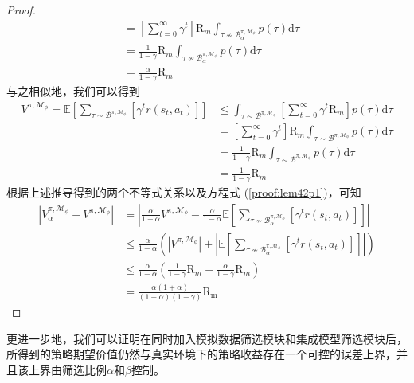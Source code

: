 \begin{proof}
\begin{align}
&=\left[\sum_{t=0}^\infty\gamma^t\right]\mathrm{R}_m\int_{\tau\not\sim{\mathcal{B}_\alpha^{\pi,\mathcal{M}_\phi}}}p(\tau)\mathrm{d}\tau\\
&= \frac{1}{1-\gamma}\mathrm{R}_m \int_{\tau\not\sim{\mathcal{B}_\alpha^{\pi,\mathcal{M}_\phi}}}p(\tau)\mathrm{d}\tau\\
&=\frac{\alpha}{1-\gamma}\mathrm{R}_m
\end{align}
与之相似地，我们可以得到
\begin{align}
V^{\pi,\mathcal{M}_\phi} = \mathbb{E}\left[{\sum}_{\tau \sim\mathcal{B}^{\pi,\mathcal{M}_\phi}}\left[\gamma^t r(s_t,a_t)\right]\right] &\leq\int_{\tau \sim\mathcal{B}^{\pi,\mathcal{M}_\phi}}\left[\sum_{t=0}^\infty\gamma^t \mathrm{R}_m\right]p(\tau)\mathrm{d}\tau\\
&=\left[\sum_{t=0}^\infty\gamma^t\right]\mathrm{R}_m\int_{\tau \sim\mathcal{B}^{\pi,\mathcal{M}_\phi}}p(\tau)\mathrm{d}\tau\\
&= \frac{1}{1-\gamma}\mathrm{R}_m \int_{\tau \sim\mathcal{B}^{\pi,\mathcal{M}_\phi}}p(\tau)\mathrm{d}\tau\\
&=\frac{1}{1-\gamma}\mathrm{R}_m
\end{align}
根据上述推导得到的两个不等式关系以及方程式 (\ref{proof:lem42p1})，可知
\begin{align}
|{V}_\alpha^{\pi, \mathcal{M}_{\phi}} - {V}^{\pi,\mathcal{M}_{\phi}}| &=  \left|\frac{\alpha}{1-\alpha}V^{\pi,\mathcal{M}_\phi}-\frac{\alpha}{1-\alpha}\mathbb{E}\left[{\sum}_{\tau \not\sim\mathcal{B}_\alpha^{\pi,\mathcal{M}_\phi}}\left[\gamma^t r(s_t,a_t)\right]\right]\right| \\
&\leq\frac{\alpha}{1-\alpha}\left(\left|V^{\pi,\mathcal{M}_\phi}\right|+\left|\mathbb{E}\left[{\sum}_{\tau \not\sim\mathcal{B}_\alpha^{\pi,\mathcal{M}_\phi}}\left[\gamma^t r(s_t,a_t)\right]\right]\right|\right)\\
&\leq \frac{\alpha}{1-\alpha}\left(\frac{1}{1-\gamma}\mathrm{R}_m+\frac{\alpha}{1-\gamma}\mathrm{R}_m\right) \\
&=\frac{\alpha(1+\alpha)}{(1-\alpha)(1-\gamma)}\mathrm{R_{m}} \label{eq:lem42}
\end{align}

\end{proof}

更进一步地，我们可以证明在同时加入模拟数据筛选模块和集成模型筛选模块后，所得到的策略期望价值仍然与真实环境下的策略收益存在一个可控的误差上界，并且该上界由筛选比例$\alpha$和$\beta$控制。

